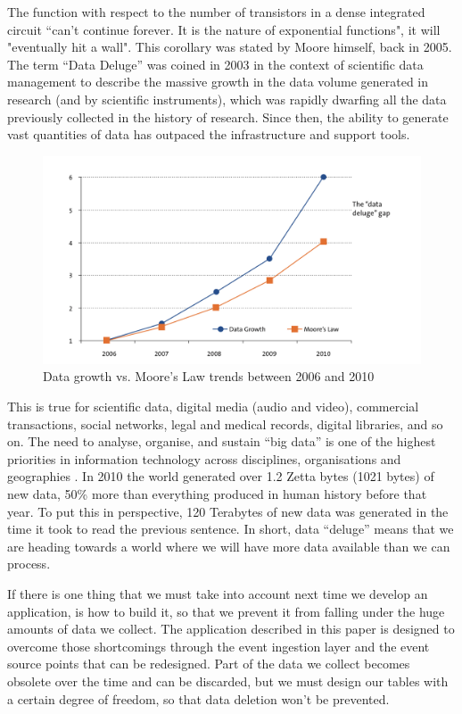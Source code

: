 The function with respect to the number of transistors in a dense integrated circuit “can’t continue forever. It is the nature of exponential functions", it will "eventually hit a wall". This corollary was stated by Moore himself, back in 2005. The term “Data Deluge” was coined in 2003 \cite{soton257695} in the context of scientific data management to describe the massive growth in the data volume generated in research (and by scientific instruments), which was rapidly dwarfing all the data previously collected in the history of research. Since then, the ability to generate vast quantities of data has outpaced the infrastructure and support tools.

\begin{figure}[htp]
    \centering
    \includegraphics[width = 15.5cm]{figures/MooreVsDataGrowth}
    \caption{Data growth vs. Moore’s Law trends between 2006 and 2010 \cite{HiPEAC}}
    \label{fig:dataDeluge}
\end{figure}

This is true for scientific data, digital media (audio and video), commercial transactions, social networks, legal and medical records, digital libraries, and so on. The need to analyse, organise, and sustain “big data” is one of the highest priorities in information technology across disciplines, organisations and geographies \cite{pvsc}. In 2010 the world generated over 1.2 Zetta bytes (1021 bytes) of new data, 50\% more than everything produced in human history before that year. To put this in perspective, 120 Terabytes of new data was generated in the time it took to read the previous sentence. In short, data “deluge” means that we are heading towards a world where we will have more data available than we can process. \cite{HiPEAC}

If there is one thing that we must take into account next time we develop an application, is how to build it, so that we prevent it from falling under the huge amounts of data we collect. The application described in this paper is designed to overcome those shortcomings through the event ingestion layer and the event source points that can be redesigned. Part of the data we collect becomes obsolete over the time and can be discarded, but we must design our tables with a certain degree of freedom, so that data deletion won't be prevented.

